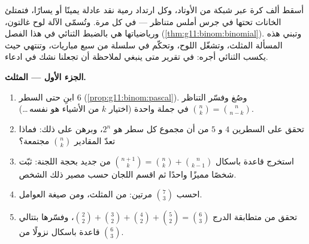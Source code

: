 \begin{problem}
\label{pb:g11:binom:1}
أسقط ألف كرة عبر شبكة من الأوتاد، وكل ارتداد
رمية نقد عادلة يمينًا أو يسارًا، فتمتلئ الخانات تحتها في
جرس أملس متناظر --- في كل مرة. وتُسمّى الآلة
لوح غالتون، ورياضياتها هي بالضبط  الثنائي
في هذا الفصل (\cref{thm:g11:binom:binomial}). وتبني هذه
المسألة المثلث، وتشغّل اللوح، وتحكّم في
سلسلة من سبع مباريات، وتنتهي حيث يكسب  الثنائي
أجره: في تقرير متى ينبغي لملاحظة أن تجعلنا نشك في
ادعاء.

\medskip
\noindent\textbf{الجزء الأول --- المثلث.}
\begin{enumerate}
  \item ابنِ  حتى السطر $6$
        (\cref{prop:g11:binom:pascal}). وصُغ وفسّر
        التناظر $\binom nk = \binom{n}{n-k}$ في جملة واحدة
        (اختيار $k$ من الأشياء هو نفسه\,\dots).
  \item تحقق على السطرين $4$ و $5$ من أن مجموع كل سطر هو $2^n$،
        وبرهن على ذلك: فماذا تعدّ المقادير $\binom nk$
        مجتمعة؟
  \item استخرج قاعدة باسكال
        $\binom{n+1}{k} = \binom nk + \binom{n}{k-1}$ من جديد بحجة
        اللجنة: ثبّت شخصًا مميزًا واحدًا ثم
        اقسم اللجان حسب مصير ذلك الشخص.
  \item احسب $\binom73$ مرتين: من المثلث، ومن
        صيغة العوامل.
  \item تحقق من متطابقة الدرج
        $\binom22 + \binom32 + \binom42 + \binom52 =
        \binom63$، وفسّرها بتتالي قاعدة باسكال
        نزولًا من $\binom63$.
\end{enumerate}


\end{problem}
